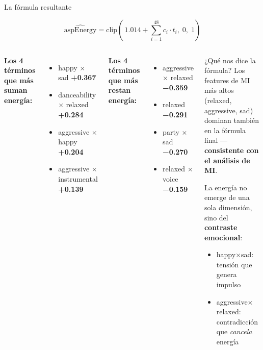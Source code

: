 \documentclass[aspectratio=169]{beamer}
\begin{document}
\begin{frame}{La fórmula resultante}

  \[
    \widehat{\text{aspEnergy}} = \text{clip}\!\left(\,1.014 + \sum_{i=1}^{48} c_i \cdot t_i,\; 0,\; 1\right)
  \]

  \bigskip
  \begin{columns}
      \textbf{\color{aspgreen}Los 4 términos que más suman energía:}
      \small
      \begin{itemize}
        \item happy $\times$ sad \hfill \textbf{+0.367}
        \item danceability $\times$ relaxed \hfill \textbf{+0.284}
        \item aggressive $\times$ happy \hfill \textbf{+0.204}
        \item aggressive $\times$ instrumental \hfill \textbf{+0.139}
      \end{itemize}

      \bigskip
      \textbf{\color{aspred}Los 4 términos que más restan energía:}
      \small
      \begin{itemize}
        \item aggressive $\times$ relaxed \hfill \textbf{−0.359}
        \item relaxed \hfill \textbf{−0.291}
        \item party $\times$ sad \hfill \textbf{−0.270}
        \item relaxed $\times$ voice \hfill \textbf{−0.159}
      \end{itemize}

      \begin{block}{¿Qué nos dice la fórmula?}
        Los features de MI más altos (relaxed, aggressive, sad) dominan también en la fórmula final — \textbf{consistente con el análisis de MI}.

        \bigskip
        La energía no emerge de una sola dimensión, sino del \textbf{contraste emocional}:
        \begin{itemize}
          \item happy$\times$sad: tensión que genera impulso
          \item aggressive$\times$relaxed: contradicción que \textit{cancela} energía
        \end{itemize}
      \end{block}
  \end{columns}

\end{frame}
\end{document}
